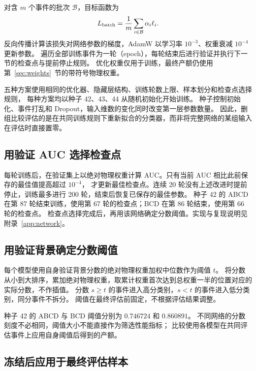 \documentclass[11pt,a4paper,fontset=fandol,scheme=plain]{ctexart}
\begin{document}
对含 $m$ 个事件的批次 $\mathcal B$，目标函数为
\[
 L_{\rm batch}=\frac{1}{m}\sum_{i\in\mathcal B}\alpha_i\ell_i.
\]
反向传播计算该损失对网络参数的梯度，AdamW 以学习率 $10^{-3}$、权重衰减 $10^{-4}$ 更新参数。
遍历全部训练事件为一轮（epoch），每轮结束后进行验证并执行下一节的检查点与提前停止规则。
优化权重仅用于训练，最终产额仍使用第~\ref{sec:weights}~节的带符号物理权重。

五种方案使用相同的优化器、隐藏层结构、训练轮数上限、样本划分和检查点选择规则，
每种方案均以种子 42、43、44 从随机初始化开始训练。
种子控制初始化、事件打乱和 Dropout，输入维数的变化同时改变第一层参数数量。
因此，删组比较评估的是在共同训练规则下重新拟合的分类器，而非将完整网络的某组输入在评估时直接置零。


\subsection{用验证 AUC 选择检查点}

每轮训练后，在验证集上以绝对物理权重计算 AUC。只有当前 AUC 相比此前保存的最佳值提高超过 $10^{-4}$，
才更新最佳检查点。连续 20 轮没有上述改进时提前停止，训练最多进行 200 轮，结束后恢复已保存的最佳参数。
种子 42 的 ABCD 在第 87 轮结束训练，使用第 67 轮的检查点；BCD 在第 86 轮结束，使用第 66 轮的检查点。
检查点选择完成后，再用该网络确定分数阈值。实现与复现说明见附录~\ref{app:network}。


\subsection{用验证背景确定分数阈值}
\label{sec:threshold}

每个模型使用自身验证背景分数的绝对物理权重加权中位数作为阈值 $t$。
将分数从小到大排序，累加绝对物理权重，取累计权重首次达到总权重一半的位置对应的实际分数，不作插值。
分数 $s\geq t$ 的事件进入高分类别，$s<t$ 的事件进入低分类别，同分事件不拆分。
阈值在最终评估前固定，不根据评估结果调整。

种子 42 的 ABCD 与 BCD 阈值分别为 $0.746724$ 和 $0.860891$。
不同网络的分数刻度不必相同，阈值大小不能直接作为筛选性能指标；
比较使用各模型在共同评估事件上应用自身阈值后得到的产额。


\subsection{冻结后应用于最终评估样本}
\end{document}
